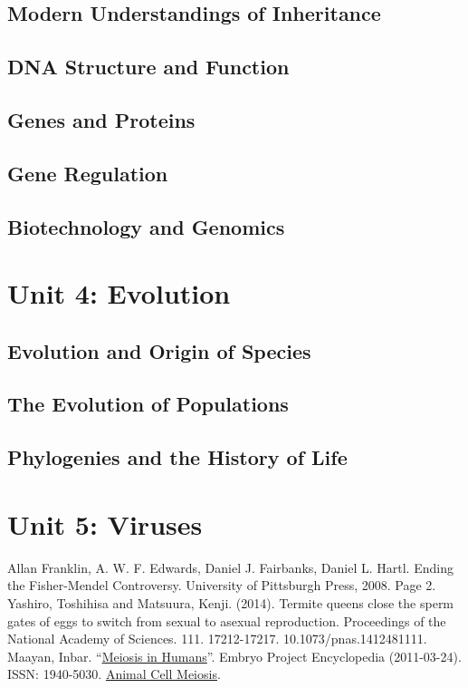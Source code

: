 \documentclass[12pt]{article}
\begin{document}
\subsection{Modern Understandings of Inheritance}
\subsection{DNA Structure and Function}
\subsection{Genes and Proteins}
\subsection{Gene Regulation}
\subsection{Biotechnology and Genomics}

\section{Unit 4: Evolution}
\subsection{Evolution and Origin of Species}
\subsection{The Evolution of Populations}
\subsection{Phylogenies and the History of Life}

\section{Unit 5: Viruses}

\begin{thebibliography}{00}
     Allan Franklin, A. W. F. Edwards, Daniel J. Fairbanks, Daniel L. Hartl. Ending the Fisher-Mendel Controversy. University of Pittsburgh Press, 2008. Page 2.
     Yashiro, Toshihisa and Matsuura, Kenji. (2014). Termite queens close the sperm gates of eggs to switch from sexual to asexual reproduction. Proceedings of the National Academy of Sciences. 111. 17212-17217. 10.1073/pnas.1412481111. 
     Maayan, Inbar. ``\href{http://embryo.asu.edu/handle/10776/2084}{Meiosis in Humans}''. Embryo Project Encyclopedia (2011-03-24). ISSN: 1940-5030. 
     \href{https://www.cellsalive.com/meiosis_js.htm}{Animal Cell Meiosis}.
\end{thebibliography}
\end{document}
